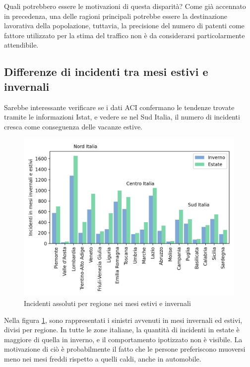 \documentclass[a4paper]{report}
\begin{document}
Quali potrebbero essere le motivazioni di questa disparità?
Come già accennato in precedenza, una delle ragioni principali 
potrebbe essere la destinazione lavorativa della popolazione, tuttavia, 
la precisione del numero di patenti come fattore utilizzato per la stima 
del traffico non è da considerarsi particolarmente attendibile. 

\subsection{Differenze di incidenti tra mesi estivi e invernali}

Sarebbe interessante verificare se i dati ACI confermano le tendenze trovate tramite 
le informazioni Istat, e vedere se nel Sud Italia, il numero di incidenti cresca 
come conseguenza delle vacanze estive. 

\begin{figure}
    \includegraphics[width=\linewidth]{../src/incidenti/incidenti_aci/mappe_regioni/estate_inverno.png}
    \caption{Incidenti assoluti per regione nei mesi estivi e invernali}
    \label{fig:estate-inverno}
\end{figure}

Nella figura \ref{fig:estate-inverno}, sono rappresentati i sinistri avvenuti 
in mesi invernali ed estivi, divisi per regione. 
In tutte le zone italiane, la quantità di incidenti in estate è maggiore di quella 
in inverno, e il comportamento ipotizzato non è visibile. 
La motivazione di ciò è probabilmente il fatto che 
le persone preferiscono muoversi meno nei mesi freddi rispetto a quelli caldi, 
anche in automobile. 
\end{document}
